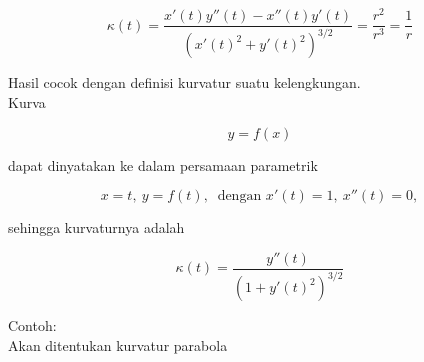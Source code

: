 \documentclass[12pt,Times new roman,letterpaper]{book}
\begin{document}
\begin{eulernootebook}
\begin{eulercomment}
\begin{eulercomment}
\begin{eulernootebook}
\begin{eulercomment}
\begin{eulercomment}
\begin{eulercomment}
\begin{eulercomment}
\begin{eulercomment}
\begin{eulercomment}
\begin{eulernotebook}
\begin{eulercomment}
\begin{eulercomment}
\begin{eulercomment}
\begin{eulercomment}
\begin{eulercomment}
\begin{eulercomment}
\begin{eulercomment}
\begin{eulercomment}
\begin{eulercomment}
\begin{eulercomment}
\begin{eulercomment}
\begin{eulercomment}
\begin{eulercomment}
\begin{eulercomment}
\begin{eulercomment}
\begin{eulercomment}
\begin{eulercomment}
\begin{eulercomment}
\begin{eulercomment}
\begin{eulercomment}
\begin{eulercomment}
\end{eulercomment}
\begin{eulerformula}
\[
\kappa(t)=\frac{x'(t)y''(t)-x''(t)y'(t)}{\left(x'(t)^2+y'(t)^2\right)^{3/2}}=\frac{r^2}{r^3}=\frac 1 r
\]
\end{eulerformula}
\begin{eulercomment}
Hasil cocok dengan definisi kurvatur suatu kelengkungan.\\
Kurva

\end{eulercomment}
\begin{eulerformula}
\[
y=f(x)
\]
\end{eulerformula}
\begin{eulercomment}
dapat dinyatakan ke dalam persamaan parametrik

\end{eulercomment}
\begin{eulerformula}
\[
x=t,\ y=f(t),\ \text{ dengan } x'(t)=1,\ x''(t)=0,
\]
\end{eulerformula}
\begin{eulercomment}
sehingga kurvaturnya adalah

\end{eulercomment}
\begin{eulerformula}
\[
\kappa(t) = \frac{y''(t)}{\left(1+y'(t)^2\right)^{3/2}}
\]
\end{eulerformula}
\begin{eulercomment}
Contoh:\\
Akan ditentukan kurvatur parabola


\end{eulercomment}
\end{eulercomment}
\end{eulercomment}
\end{eulercomment}
\end{eulercomment}
\end{eulercomment}
\end{eulercomment}
\end{eulercomment}
\end{eulercomment}
\end{eulercomment}
\end{eulercomment}
\end{eulercomment}
\end{eulercomment}
\end{eulercomment}
\end{eulercomment}
\end{eulercomment}
\end{eulercomment}
\end{eulercomment}
\end{eulercomment}
\end{eulercomment}
\end{eulercomment}
\end{eulernotebook}
\end{eulercomment}
\end{eulercomment}
\end{eulercomment}
\end{eulercomment}
\end{eulercomment}
\end{eulercomment}
\end{eulernootebook}
\end{eulercomment}
\end{eulercomment}
\end{eulernootebook}
\end{document}
